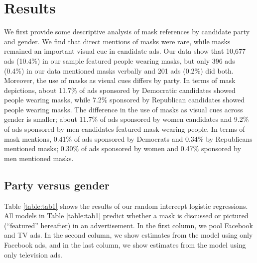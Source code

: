 {\section*{Results}
We first provide some descriptive analysis of mask references by candidate party and gender. We find that direct mentions of masks were rare, while masks remained an important visual cue in candidate ads. Our data show that 10,677 ads (10.4\%) in our sample featured people wearing masks, but only 396 ads (0.4\%) in our data mentioned masks verbally and 201 ads (0.2\%) did both. Moreover, the use of masks as visual cues differs by party. In terms of mask depictions, about 11.7\% of ads sponsored by Democratic candidates showed people wearing masks, while 7.2\% sponsored by Republican candidates showed people wearing masks. The difference in the use of masks as visual cues across gender is smaller; about 11.7\% of ads sponsored by women candidates and 9.2\% of ads sponsored by men candidates featured mask-wearing people. In terms of mask mentions, 0.41\% of ads sponsored by Democrats and 0.34\% by Republicans mentioned masks; 0.30\% of ads sponsored by women and 0.47\% sponsored by men mentioned masks. 

\subsection*{Party versus gender}
Table \ref{table:tab1} shows the results of our random intercept logistic regressions. All models in Table \ref{table:tab1} predict whether a mask is discussed or pictured (``featured'' hereafter) in an advertisement. In the first column, we pool Facebook and TV ads. In the second column, we show estimates from the model using only Facebook ads, and in the last column, we show estimates from the model using only television ads. 


\begin{table}[!htbp]
    \caption{Random Intercept Logistic Regression Predicting Mask Reference}
\footnotesize
    \centering
    
    \label{table:tab1}
\end{table}

}
